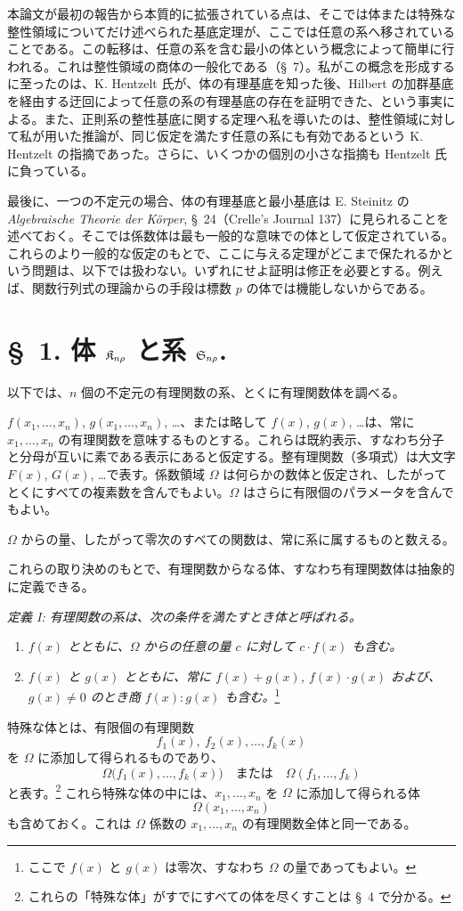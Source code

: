 \documentclass[11pt]{article}
\begin{document}
本論文が最初の報告から本質的に拡張されている点は、そこでは体または特殊な整性領域についてだけ述べられた基底定理が、ここでは任意の系へ移されていることである。この転移は、任意の系を含む最小の体という概念によって簡単に行われる。これは整性領域の商体の一般化である（\S\ 7）。私がこの概念を形成するに至ったのは、K. Hentzelt 氏が、体の有理基底を知った後、Hilbert の加群基底を経由する迂回によって任意の系の有理基底の存在を証明できた、という事実による。また、正則系の整性基底に関する定理へ私を導いたのは、整性領域に対して私が用いた推論が、同じ仮定を満たす任意の系にも有効であるという K. Hentzelt の指摘であった。さらに、いくつかの個別の小さな指摘も Hentzelt 氏に負っている。

最後に、一つの不定元の場合、体の有理基底と最小基底は E. Steinitz の \emph{Algebraische Theorie der Körper}, \S\ 24（Crelle's Journal 137）に見られることを述べておく。そこでは係数体は最も一般的な意味での体として仮定されている。これらのより一般的な仮定のもとで、ここに与える定理がどこまで保たれるかという問題は、以下では扱わない。いずれにせよ証明は修正を必要とする。例えば、関数行列式の理論からの手段は標数 $p$ の体では機能しないからである。

\section*{\S\ 1. 体 $\mathfrak{K}_{n\rho}$ と系 $\mathfrak{S}_{n\rho}$.}

以下では、$n$ 個の不定元の有理関数の系、とくに有理関数体を調べる。

$f(x_1,\ldots,x_n)$, $g(x_1,\ldots,x_n)$, \ldots、または略して $f(x)$, $g(x)$, \ldots は、常に $x_1,\ldots,x_n$ の有理関数を意味するものとする。これらは既約表示、すなわち分子と分母が互いに素である表示にあると仮定する。整有理関数（多項式）は大文字 $F(x)$, $G(x)$, \ldots で表す。係数領域 $\Omega$ は何らかの数体と仮定され、したがってとくにすべての複素数を含んでもよい。$\Omega$ はさらに有限個のパラメータを含んでもよい。

$\Omega$ からの量、したがって零次のすべての関数は、常に系に属するものと数える。

これらの取り決めのもとで、有理関数からなる体、すなわち有理関数体は抽象的に定義できる。

\emph{定義 I: 有理関数の系は、次の条件を満たすとき体と呼ばれる。}
\begin{enumerate}
\item \emph{$f(x)$ とともに、$\Omega$ からの任意の量 $c$ に対して $c\cdot f(x)$ も含む。}
\item \emph{$f(x)$ と $g(x)$ とともに、常に $f(x)+g(x)$, $f(x)\cdot g(x)$ および、$g(x)\ne0$ のとき商 $f(x):g(x)$ も含む。}\footnote{ここで $f(x)$ と $g(x)$ は零次、すなわち $\Omega$ の量であってもよい。}
\end{enumerate}
特殊な体とは、有限個の有理関数
\[
  f_1(x),\ f_2(x),\ldots, f_k(x)
\]
を $\Omega$ に添加して得られるものであり、
\[
  \Omega\bigl(f_1(x),\ldots,f_k(x)\bigr)
  \quad\text{または}\quad
  \Omega(f_1,\ldots,f_k)
\]
と表す。\footnote{これらの「特殊な体」がすでにすべての体を尽くすことは \S\ 4 で分かる。}
これら特殊な体の中には、$x_1,\ldots,x_n$ を $\Omega$ に添加して得られる体
\[
  \Omega(x_1,\ldots,x_n)
\]
も含めておく。これは $\Omega$ 係数の $x_1,\ldots,x_n$ の有理関数全体と同一である。
\end{document}
